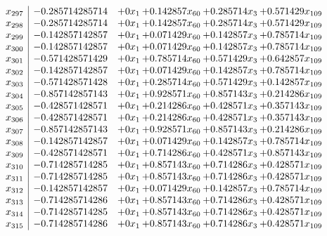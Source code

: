 \documentclass[11pt]{article}
\begin{document}
\[\begin{array}{c| c c@{\hskip 2pt} c@{\hskip 2pt} c@{\hskip 2pt} c@{\hskip 2pt} }
 x_{297}   &  -0.285714285714 & + 0 x_{1} & + 0.142857 x_{60} & + 0.285714 x_{3} & + 0.571429 x_{109}\\
 x_{298}   &  -0.285714285714 & + 0 x_{1} & + 0.142857 x_{60} & + 0.285714 x_{3} & + 0.571429 x_{109}\\
 x_{299}   &  -0.142857142857 & + 0 x_{1} & + 0.071429 x_{60} & + 0.142857 x_{3} & + 0.785714 x_{109}\\
 x_{300}   &  -0.142857142857 & + 0 x_{1} & + 0.071429 x_{60} & + 0.142857 x_{3} & + 0.785714 x_{109}\\
 x_{301}   &  -0.571428571429 & + 0 x_{1} & + 0.785714 x_{60} & + 0.571429 x_{3} & + 0.642857 x_{109}\\
 x_{302}   &  -0.142857142857 & + 0 x_{1} & + 0.071429 x_{60} & + 0.142857 x_{3} & + 0.785714 x_{109}\\
 x_{303}   &  -0.571428571428 & + 0 x_{1} & + 0.285714 x_{60} & + 0.571429 x_{3} & + 0.142857 x_{109}\\
 x_{304}   &  -0.857142857143 & + 0 x_{1} & + 0.928571 x_{60} & + 0.857143 x_{3} & + 0.214286 x_{109}\\
 x_{305}   &  -0.428571428571 & + 0 x_{1} & + 0.214286 x_{60} & + 0.428571 x_{3} & + 0.357143 x_{109}\\
 x_{306}   &  -0.428571428571 & + 0 x_{1} & + 0.214286 x_{60} & + 0.428571 x_{3} & + 0.357143 x_{109}\\
 x_{307}   &  -0.857142857143 & + 0 x_{1} & + 0.928571 x_{60} & + 0.857143 x_{3} & + 0.214286 x_{109}\\
 x_{308}   &  -0.142857142857 & + 0 x_{1} & + 0.071429 x_{60} & + 0.142857 x_{3} & + 0.785714 x_{109}\\
 x_{309}   &  -0.428571428571 & + 0 x_{1} & + 0.714286 x_{60} & + 0.428571 x_{3} & + 0.857143 x_{109}\\
 x_{310}   &  -0.714285714285 & + 0 x_{1} & + 0.857143 x_{60} & + 0.714286 x_{3} & + 0.428571 x_{109}\\
 x_{311}   &  -0.714285714285 & + 0 x_{1} & + 0.857143 x_{60} & + 0.714286 x_{3} & + 0.428571 x_{109}\\
 x_{312}   &  -0.142857142857 & + 0 x_{1} & + 0.071429 x_{60} & + 0.142857 x_{3} & + 0.785714 x_{109}\\
 x_{313}   &  -0.714285714286 & + 0 x_{1} & + 0.857143 x_{60} & + 0.714286 x_{3} & + 0.428571 x_{109}\\
 x_{314}   &  -0.714285714285 & + 0 x_{1} & + 0.857143 x_{60} & + 0.714286 x_{3} & + 0.428571 x_{109}\\
 x_{315}   &  -0.714285714286 & + 0 x_{1} & + 0.857143 x_{60} & + 0.714286 x_{3} & + 0.428571 x_{109}\\

\end{array}\]
\end{document}
